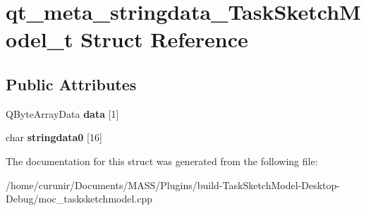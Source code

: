 \hypertarget{structqt__meta__stringdata___task_sketch_model__t}{}\section{qt\+\_\+meta\+\_\+stringdata\+\_\+\+Task\+Sketch\+Model\+\_\+t Struct Reference}
\label{structqt__meta__stringdata___task_sketch_model__t}
\subsection*{Public Attributes}
\begin{DoxyCompactItemize}
\item 
Q\+Byte\+Array\+Data {\bfseries data} \mbox{[}1\mbox{]}\hypertarget{structqt__meta__stringdata___task_sketch_model__t_ad7f0c5f19e0c23adb4bf8505835425eb}{}\label{structqt__meta__stringdata___task_sketch_model__t_ad7f0c5f19e0c23adb4bf8505835425eb}

\item 
char {\bfseries stringdata0} \mbox{[}16\mbox{]}\hypertarget{structqt__meta__stringdata___task_sketch_model__t_af868e7bd11b0516e7e1528e69e06d72e}{}\label{structqt__meta__stringdata___task_sketch_model__t_af868e7bd11b0516e7e1528e69e06d72e}

\end{DoxyCompactItemize}


The documentation for this struct was generated from the following file\+:\begin{DoxyCompactItemize}
\item 
/home/curunir/\+Documents/\+M\+A\+S\+S/\+Plugins/build-\/\+Task\+Sketch\+Model-\/\+Desktop-\/\+Debug/moc\+\_\+tasksketchmodel.\+cpp\end{DoxyCompactItemize}

